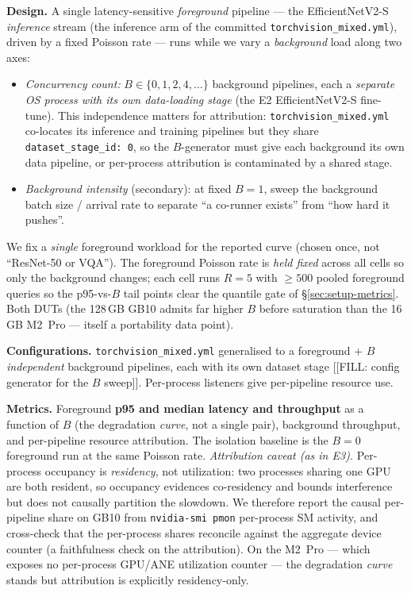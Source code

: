 \textbf{Design.} A single latency-sensitive \emph{foreground} pipeline ---
the EfficientNetV2-S \emph{inference} stream (the inference arm of the
committed \texttt{torchvision\_mixed.yml}), driven by a fixed Poisson rate
--- runs while we vary a \emph{background} load along two axes:
\begin{itemize}
  \item \emph{Concurrency count:} $B\in\{0,1,2,4,\dots\}$ background
    pipelines, each a \emph{separate OS process with its own
    data-loading stage} (the E2 EfficientNetV2-S fine-tune). This
    independence matters for attribution: \texttt{torchvision\_mixed.yml}
    co-locates its inference and training pipelines but they share
    \texttt{dataset\_stage\_id: 0}, so the $B$-generator must give each
    background its own data pipeline, or per-process attribution is
    contaminated by a shared stage.
  \item \emph{Background intensity} (secondary): at fixed $B{=}1$, sweep
    the background batch size / arrival rate to separate ``a co-runner
    exists'' from ``how hard it pushes''.
\end{itemize}
We fix a \emph{single} foreground workload for the reported curve (chosen
once, not ``ResNet-50 or VQA''). The foreground Poisson rate is
\emph{held fixed} across all cells so only the background changes; each
cell runs $R{=}5$ with $\geq\num{500}$ pooled foreground queries so the
p95-vs-$B$ tail points clear the quantile gate of
\S\ref{sec:setup-metrics}. Both DUTs (the 128\,GB GB10 admits far higher
$B$ before saturation than the 16\,GB M2~Pro --- itself a portability data
point).

\textbf{Configurations.} \texttt{torchvision\_mixed.yml} generalised to a
foreground + $B$ \emph{independent} background pipelines, each with its own
dataset stage [[FILL: config generator for the $B$ sweep]]. Per-process
listeners give per-pipeline resource use.

\textbf{Metrics.} Foreground \textbf{p95 and median latency and
throughput} as a function of $B$ (the degradation \emph{curve}, not a
single pair), background throughput, and per-pipeline resource
attribution. The isolation baseline is the $B{=}0$ foreground run at the
same Poisson rate. \emph{Attribution caveat (as in E3).} Per-process
occupancy is \emph{residency}, not utilization: two processes sharing one
GPU are both resident, so occupancy evidences co-residency and bounds
interference but does not causally partition the slowdown. We therefore
report the causal per-pipeline share on GB10 from \texttt{nvidia-smi pmon}
per-process SM activity, and cross-check that the per-process shares
reconcile against the aggregate device counter (a faithfulness check on
the attribution). On the M2~Pro --- which exposes no per-process GPU/ANE
utilization counter --- the degradation \emph{curve} stands but attribution
is explicitly residency-only.

